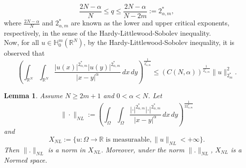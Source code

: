 \documentclass[reqno]{amsart}
\newtheorem{lemma}[theorem]{Lemma}
\newcommand{\Om}{\Omega}
\newcommand{\al} {\alpha}
\newcommand{\noi} {  \noindent}
\newcommand{\mb} {\mathbb}
\numberwithin{theorem}{section} \numberwithin{equation}{section}
\begin{document}
\[\frac{2N - \al}{N} \leq q \leq \frac{2N- \al}{N- 2m} := 2_{\al, m}^*, \]
where $\frac{2N- \al}{N}$ and $2_{\al, m}^*$ are known as the lower and upper critical exponents, respectively, in the sense of the Hardy-Littlewood-Sobolev inequality.\\
\noi Now, for all $u \in\mb{H}_0^m(\mb{R}^N)$, by the Hardy-Littlewood-Sobolev inequality, it is observed that
\begin{equation}\label{e3}
\left({\int_{\mb{R}^N} \int_{\mb{R}^N} \frac{|u(x)|^{2_{\al, m}^*}|u(y)|^{2_{\al, m}^*}}{|x - y|^\al} \, dx\, dy } \right)^ \frac{1}{2_{\al, m}^*}
\leq (C(N, \al))^{\frac{1}{2_{\al, m}^*}} \|u\|_{2_m^*}^{2}.
\end{equation}
\begin{lemma} \label{l17}
Assume $N\geq2m+1$ and $0<\al<N$. Let
\[\|\cdot\|_{NL}:= \left(\int_{\Om} \int_{\Om} \frac{|\cdot|^{2^*_{\al,m}}|\cdot|^{2^*_{\al,m}}}{|x-y|^\al} \,dx \,dy\right)^{\frac{1}{22^*_{\al, m}}}\] 
and \[X_{NL}:=\{u:\Om \to \mb{R} \text{ is measuraable}, \|u\|_{NL} <+\infty\}.\]
Then $\|.\|_{NL}$ is a norm in $X_{NL}$. Moreover, under the norm $\|.\|_{NL}$, $X_{NL}$ is a Normed space.  
\end{lemma}
\end{document}
